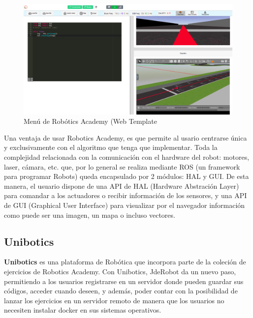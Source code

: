 \begin{figure} [h!]
  \begin{center}
    \includegraphics[width=15cm]{imagenes/robotics-academy-web-template.png}
  \end{center}
  \caption[Robotics Academy (Web Template)]{Menú de Robótics Academy (Web Template}
  \label{fig:rob-ac-web-template}
\end{figure}

Una ventaja de usar Robotics Academy, es que permite al usario centrarse única y exclusivamente con el algoritmo que tenga que implementar. Toda la complejidad relacionada con la comunicación con el hardware del robot: motores, laser, cámara, etc. que, por lo general se realiza mediante ROS (un framework para programar Robots) queda encapsulado por 2 módulos: HAL y GUI. De esta manera, el usuario dispone de una API de HAL (Hardware Abstración Layer) para comandar a los actuadores o recibir información de los sensores, y una API de GUI (Graphical User Interface) para visualizar por el navegador información como puede ser una imagen, un mapa o incluso vectores.\\

\subsection{Unibotics}
\label{sec:unibotics}

\textbf{Unibotics} es una plataforma de Robótica que incorpora parte de la coleción de ejercicios de Robotics Academy. Con Unibotics, JdeRobot da un nuevo paso, permitiendo a los usuarios registrarse en un servidor donde pueden guardar sus códigos, acceder cuando deseen, y además, poder contar con la posibilidad de lanzar los ejercicios en un servidor remoto de manera que los usuarios no necesiten instalar docker en sus sistemas operativos.\\

